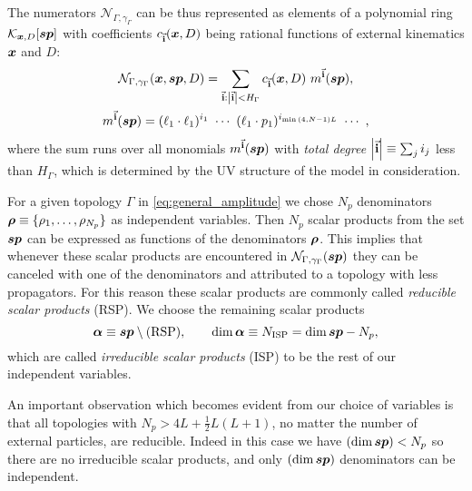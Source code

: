 The numerators $\mathcal{N}_{\Gamma,\gamma_\Gamma}$ can be thus represented as elements of a polynomial ring
$\mathcal{K}_{\vb*{x},D}[\vb*{sp}]$ 
with coefficients $c_{\va{i}}(\vb*{x},D)$ being rational functions of external kinematics $\vb*{x}$ and $D$:
\begin{multline}
  \mathcal{N}_{\Gamma,\gamma_\Gamma}(\vb*{x}, \vb*{sp}, D) = \sum_{\va{i} : \abs{\va{i}} < H_{\Gamma}} c_{\va{i}} (\vb*{x},D)~ m^{\va{i}}(\vb*{sp}), \\
  m^{\va{i}}(\vb*{sp}) = (\sp(\ell_1,\ell_1))^{i_1} ~\cdots~ (\sp(\ell_1,p_1))^{i_{\min\qty(4,N-1)L}} ~\cdots~,
\end{multline}
where the sum runs over all monomials $m^{\va{i}}(\vb*{sp})$ with \emph{total degree} $\abs{\va{i}} \equiv \sum_j i_j$ less than
$ H_{\Gamma} $, which is determined by the UV structure of the model in consideration.


For a given topology $\Gamma$ in \cref{eq:general_amplitude} we chose $N_p$ denominators $\vb*{\rho}\equiv\{\rho_1,\ldots,\rho_{N_p}\}$ as
independent variables. Then $N_p$ scalar products from the set $\vb*{sp}$
can be expressed as functions of the denominators $\vb*{\rho}$.
This implies
that whenever these scalar products are encountered in $\mathcal{N}_{\Gamma,\gamma_\Gamma}\qty(\vb*{sp})$ they can be canceled with
one of the denominators and attributed to a topology with less propagators.
For this reason these scalar products are commonly called \emph{reducible scalar products} (RSP).
We choose the remaining scalar products
\begin{equation}
  \vb*{\alpha} \equiv \vb*{sp} \setminus \text{(RSP)}, \qquad \dim{\vb*{\alpha}} \equiv N_\text{ISP} =  \dim{\vb*{sp}}-N_p,
\end{equation}
which are called
\emph{irreducible scalar products} (ISP) to be the rest of our independent variables.

An important observation which becomes evident from our choice of variables is that all topologies with $N_p> 4 L +\frac{1}{2}L(L+1)$, no matter the number of external particles, are reducible.
Indeed in this case we have $(\dim\vb*{sp}) < N_p$ so there are no irreducible scalar products, and only $(\dim\vb*{sp})$ denominators can be independent.


